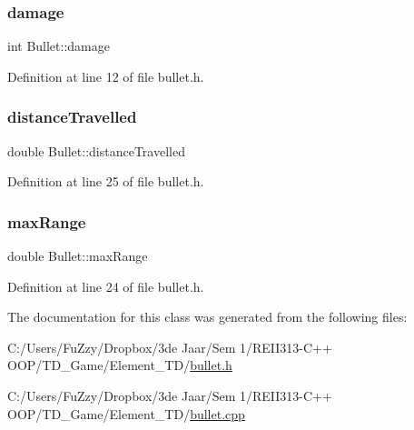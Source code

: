 \subsubsection{\texorpdfstring{damage}{damage}}
{\footnotesize\ttfamily int Bullet\+::damage}



Definition at line 12 of file bullet.\+h.

\mbox{\label{class_bullet_afe194c1b7e495d0c17492396595202e1}} 
\subsubsection{\texorpdfstring{distance\+Travelled}{distanceTravelled}}
{\footnotesize\ttfamily double Bullet\+::distance\+Travelled\hspace{0.3cm}{\ttfamily [private]}}



Definition at line 25 of file bullet.\+h.

\mbox{\label{class_bullet_ae7c4fadfcc22643cb271622fe8bb2eb0}} 
\subsubsection{\texorpdfstring{max\+Range}{maxRange}}
{\footnotesize\ttfamily double Bullet\+::max\+Range\hspace{0.3cm}{\ttfamily [private]}}



Definition at line 24 of file bullet.\+h.



The documentation for this class was generated from the following files\+:\begin{DoxyCompactItemize}
\item 
C\+:/\+Users/\+Fu\+Zzy/\+Dropbox/3de Jaar/\+Sem 1/\+R\+E\+I\+I313-\/\+C++ O\+O\+P/\+T\+D\+\_\+\+Game/\+Element\+\_\+\+T\+D/\hyperlink{bullet_8h}{bullet.\+h}\item 
C\+:/\+Users/\+Fu\+Zzy/\+Dropbox/3de Jaar/\+Sem 1/\+R\+E\+I\+I313-\/\+C++ O\+O\+P/\+T\+D\+\_\+\+Game/\+Element\+\_\+\+T\+D/\hyperlink{bullet_8cpp}{bullet.\+cpp}\end{DoxyCompactItemize}
